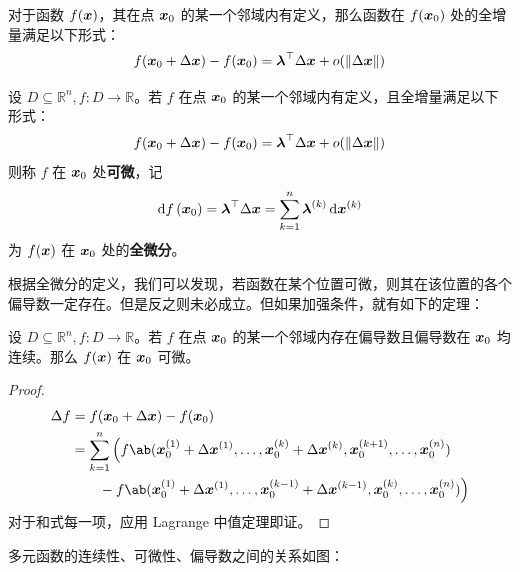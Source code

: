对于函数 $f(\boldsymbol{x})$，其在点 $\boldsymbol{x}_0$ 的某一个邻域内有定义，那么函数在 $f(\boldsymbol{x}_0)$ 处的全增量满足以下形式：
$$
f(\boldsymbol{x}_0 + \Delta \boldsymbol{x}) - f(\boldsymbol{x}_0) = \boldsymbol{\lambda}^\top \Delta \boldsymbol{x} + o(\norm{\Delta \boldsymbol{x}})
$$

\begin{definition}[全微分]
    设 $D \subseteq \mathbb{R}^n, f: D \to \mathbb{R}$。若 $f$ 在点 $\boldsymbol{x}_0$ 的某一个邻域内有定义，且全增量满足以下形式：
    $$
    f(\boldsymbol{x}_0 + \Delta \boldsymbol{x}) - f(\boldsymbol{x}_0) = \boldsymbol{\lambda}^\top \Delta \boldsymbol{x} + o(\norm{\Delta \boldsymbol{x}})
    $$
    则称 $f$ 在 $\boldsymbol{x}_0$ 处\textbf{可微}，记
    $$
    \dd{f}(\boldsymbol{x}_0) = \boldsymbol{\lambda}^\top \Delta \boldsymbol{x} = \sum_{k = 1}^n \boldsymbol{\lambda}^{(k)} \dd{\boldsymbol{x}^{(k)}}
    $$
    为 $f(\boldsymbol{x})$ 在 $\boldsymbol{x}_0$ 处的\textbf{全微分}。
\end{definition}

根据全微分的定义，我们可以发现，若函数在某个位置可微，则其在该位置的各个偏导数一定存在。但是反之则未必成立。但如果加强条件，就有如下的定理：

\begin{theorem}
    设 $D \subseteq \mathbb{R}^n, f: D \to \mathbb{R}$。若 $f$ 在点 $\boldsymbol{x}_0$ 的某一个邻域内存在偏导数且偏导数在 $\boldsymbol{x}_0$ 均连续。那么 $f(\boldsymbol{x})$ 在 $\boldsymbol{x}_0$ 可微。

    \begin{proof}
        $$
        \begin{aligned}
            \Delta f & = f(\vect{x}_0 + \Delta \vect{x}) -f(\vect{x}_0) \\
            & = \sum_{k = 1}^n \Big(f\ab(\vect{x}_0^{(1)} + \Delta \vect{x}^{(1)}, \dots, \vect{x}_0^{(k)} + \Delta \vect{x}^{(k)}, \vect{x}_0^{(k + 1)}, \dots, \vect{x}_0^{(n)}) \\
            & \qquad -f\ab(\vect{x}_0^{(1)} + \Delta \vect{x}^{(1)}, \dots, \vect{x}_0^{(k - 1)} + \Delta \vect{x}^{(k - 1)}, \vect{x}_0^{(k)}, \dots, \vect{x}_0^{(n)})\Big)
        \end{aligned}
        $$
        对于和式每一项，应用 Lagrange 中值定理即证。
    \end{proof}
\end{theorem}

多元函数的连续性、可微性、偏导数之间的关系如图：

